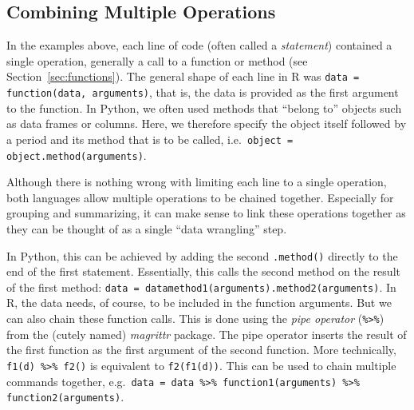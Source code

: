 \subsection{Combining Multiple Operations}

In the examples above, each line of code (often called a \emph{statement}) contained a single operation, generally a call to a function or method (see Section~\ref{sec:functions}).
The general shape of each line in R was \verb+data = function(data, arguments)+, that is, the data is provided as the first argument to the function.
In Python, we often used methods that ``belong to'' objects such as data frames or columns. Here, we therefore specify the object itself followed by a period and its method that is to be called,
i.e.\ \verb+object = object.method(arguments)+.

Although there is nothing wrong with limiting each line to a single operation, both languages allow multiple operations to be chained together.
Especially for grouping and summarizing, it can make sense to link these operations together as they can be thought of as a single ``data wrangling'' step.

In Python, this can be achieved by adding the second \verb+.method()+ directly to the end of the first statement.
Essentially, this calls the second method on the result of the first method: \verb+data = datamethod1(arguments).method2(arguments)+.
In R, the data needs, of course, to be included in the function arguments. But we can also chain these function calls.
This is done using the \emph{pipe operator} (\verb+%>%+) from the (cutely named) \emph{magrittr} package.
The pipe operator inserts the result of the first function as the first argument of the second function.
More technically, \verb+f1(d) %>% f2()+ is equivalent to \verb+f2(f1(d))+.
This can be used to chain multiple commands together, e.g.\ \verb+data = data %>% function1(arguments) %>% function2(arguments)+.

